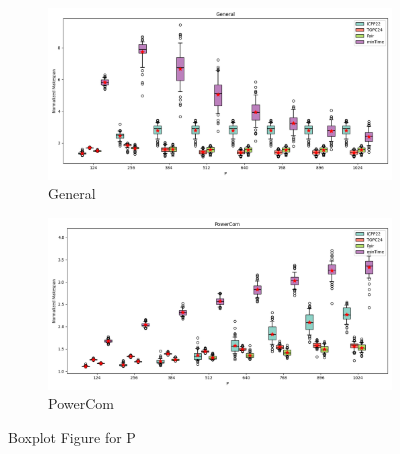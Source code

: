 \documentclass{article}
\begin{document}
\begin{figure}[htbp]
\\[2ex]
\begin{subfigure}[b]{0.32\textwidth}\includegraphics[width=\textwidth]{Results/P/P_General_boxplot}\caption{General}\label{fig:boxplot_figures_P_General}\end{subfigure}
\hfill
\begin{subfigure}[b]{0.32\textwidth}\includegraphics[width=\textwidth]{Results/P/P_PowerCom_boxplot}\caption{PowerCom}\label{fig:boxplot_figures_P_PowerCom}\end{subfigure}
\hfill
\caption{Boxplot Figure for P}
\label{fig:boxplot_figures_P}
\end{figure}
\end{document}
